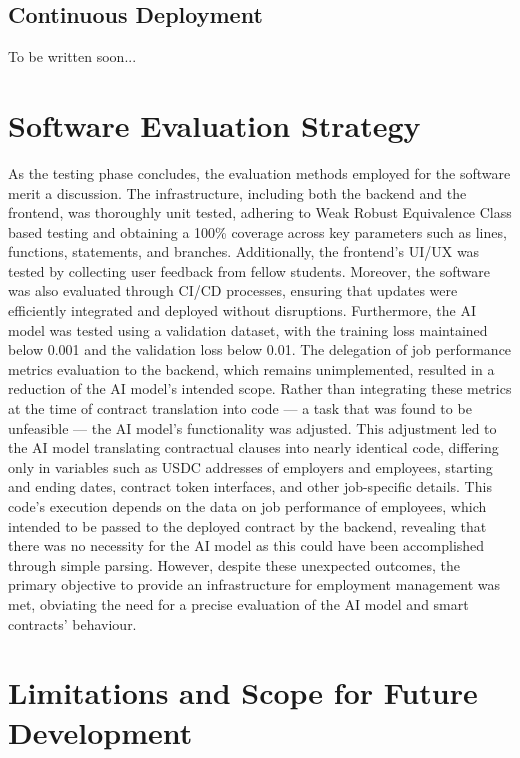 \subsection{Continuous Deployment}

To be written soon...

\section{Software Evaluation Strategy}

As the testing phase concludes, the evaluation methods employed for the software merit a discussion. The infrastructure, including both the backend and the frontend, was thoroughly unit tested, adhering to Weak Robust Equivalence Class based testing and obtaining a 100\% coverage across key parameters such as lines, functions, statements, and branches. Additionally, the frontend's UI/UX was tested by collecting user feedback from fellow students. Moreover, the software was also evaluated through CI/CD processes, ensuring that updates were efficiently integrated and deployed without disruptions. Furthermore, the AI model was tested using a validation dataset, with the training loss maintained below 0.001 and the validation loss below 0.01. The delegation of job performance metrics evaluation to the backend, which remains unimplemented, resulted in a reduction of the AI model's intended scope. Rather than integrating these metrics at the time of contract translation into code — a task that was found to be unfeasible — the AI model's functionality was adjusted. This adjustment led to the AI model translating contractual clauses into nearly identical code, differing only in variables such as USDC addresses of employers and employees, starting and ending dates, contract token interfaces, and other job-specific details. This code's execution depends on the data on job performance of employees, which intended to be passed to the deployed contract by the backend, revealing that there was no necessity for the AI model as this could have been accomplished through simple parsing. However, despite these unexpected outcomes, the primary objective to provide an infrastructure for employment management was met, obviating the need for a precise evaluation of the AI model and smart contracts' behaviour.

\section{Limitations and Scope for Future Development}

